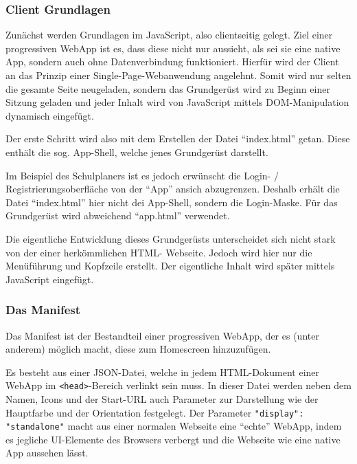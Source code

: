 \documentclass[a4paper,12pt]{scrartcl}      %
\let\oldcite\cite
\renewcommand{\cite}[1]{\textsuperscript{\oldcite{#1}}}
\newcommand{\spacer}{\par\bigskip\noindent}
\providecommand{\inlinecode}[1]{\texttt{#1}}
\begin{document}
	\subsubsection{Client Grundlagen}
	Zunächst werden Grundlagen im JavaScript, also clientseitig gelegt. Ziel einer progressiven WebApp ist es, dass diese nicht nur aussieht, als sei sie eine native App, sondern auch ohne Datenverbindung funktioniert. Hierfür wird der Client an das Prinzip einer Single-Page-Webanwendung\cite{singlePageWiki} angelehnt. Somit wird nur selten die gesamte Seite neugeladen, sondern das Grundgerüst wird zu Beginn einer Sitzung geladen und jeder Inhalt wird von JavaScript mittels DOM-Manipulation dynamisch eingefügt.\par
	Der erste Schritt wird also mit dem Erstellen der Datei ``index.html'' getan. Diese enthält die sog. App-Shell, welche jenes Grundgerüst darstellt.\par
	Im Beispiel des Schulplaners ist es jedoch erwünscht die Login- / Registrierungsoberfläche von der ``App'' ansich abzugrenzen. Deshalb erhält die Datei ``index.html'' hier nicht dei App-Shell, sondern die Login-Maske. Für das Grundgerüst wird abweichend ``app.html'' verwendet.\par
	\spacer Die eigentliche Entwicklung dieses Grundgerüsts unterscheidet sich nicht stark von der einer herkömmlichen HTML- Webseite. Jedoch wird hier nur die Menüführung und Kopfzeile erstellt. Der eigentliche Inhalt wird später mittels JavaScript eingefügt.
	
	\subsubsection{Das Manifest}
	Das Manifest ist der Bestandteil einer progressiven WebApp, der es (unter anderem) möglich macht, diese zum Homescreen hinzuzufügen.\par
	Es besteht aus einer JSON-Datei, welche in jedem HTML-Dokument einer WebApp im \inlinecode{<head>}-Bereich verlinkt sein muss. In dieser Datei werden neben dem Namen, Icons und der Start-URL auch Parameter zur Darstellung wie der Hauptfarbe und der Orientation festgelegt. Der Parameter \inlinecode{"{}display"{}: "{}standalone"{}} macht aus einer normalen Webseite eine ``echte'' WebApp, indem es jegliche UI-Elemente des Browsers verbergt und die Webseite wie eine native App aussehen lässt.\par
	
\end{document}
